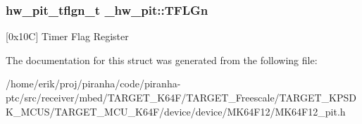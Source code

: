 \subsubsection[{\texorpdfstring{T\+F\+L\+Gn}{TFLGn}}]{ {\bf hw\+\_\+pit\+\_\+tflgn\+\_\+t} \+\_\+hw\+\_\+pit\+::\+T\+F\+L\+Gn}\hypertarget{struct__hw__pit_a5a48af1605e50720a1e5865c8c58e145}{}\label{struct__hw__pit_a5a48af1605e50720a1e5865c8c58e145}
\mbox{[}0x10C\mbox{]} Timer Flag Register 

The documentation for this struct was generated from the following file\+:\begin{DoxyCompactItemize}
\item 
/home/erik/proj/piranha/code/piranha-\/ptc/src/receiver/mbed/\+T\+A\+R\+G\+E\+T\+\_\+\+K64\+F/\+T\+A\+R\+G\+E\+T\+\_\+\+Freescale/\+T\+A\+R\+G\+E\+T\+\_\+\+K\+P\+S\+D\+K\+\_\+\+M\+C\+U\+S/\+T\+A\+R\+G\+E\+T\+\_\+\+M\+C\+U\+\_\+\+K64\+F/device/device/\+M\+K64\+F12/M\+K64\+F12\+\_\+pit.\+h\end{DoxyCompactItemize}
